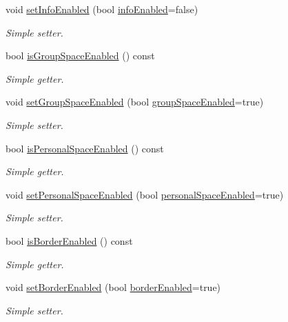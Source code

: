 \begin{DoxyCompactItemize}
void \hyperlink{classGridMap_a2c15016c5c2e1d2befdff013df12fe39}{set\+Info\+Enabled} (bool \hyperlink{classGridMap_ab106fa68828f14f788e697728b94992b}{info\+Enabled}=false)
\begin{DoxyCompactList}\small\item\em Simple setter. \end{DoxyCompactList}\item 
bool \hyperlink{classGridMap_a08ebd0d61670045ed7cbbdf33626d1af}{is\+Group\+Space\+Enabled} () const 
\begin{DoxyCompactList}\small\item\em Simple getter. \end{DoxyCompactList}\item 
void \hyperlink{classGridMap_a0923c16f8e6d2a08f02d8b32d0a5ef40}{set\+Group\+Space\+Enabled} (bool \hyperlink{classGridMap_ace7258ad25fea48c37b88e7de9c0b1b4}{group\+Space\+Enabled}=true)
\begin{DoxyCompactList}\small\item\em Simple setter. \end{DoxyCompactList}\item 
bool \hyperlink{classGridMap_ad37f0bb29e70f2cba3988fd1743d07d9}{is\+Personal\+Space\+Enabled} () const 
\begin{DoxyCompactList}\small\item\em Simple getter. \end{DoxyCompactList}\item 
void \hyperlink{classGridMap_ac5ed7378de3de7f4a4edddfb53a43af0}{set\+Personal\+Space\+Enabled} (bool \hyperlink{classGridMap_ab61a1f66414c31e4ffdd15cbd8c2f373}{personal\+Space\+Enabled}=true)
\begin{DoxyCompactList}\small\item\em Simple setter. \end{DoxyCompactList}\item 
bool \hyperlink{classGridMap_ab56b76831425dc0e3bf1c84d2a42bde1}{is\+Border\+Enabled} () const 
\begin{DoxyCompactList}\small\item\em Simple getter. \end{DoxyCompactList}\item 
void \hyperlink{classGridMap_a3ca0ec500c27b1c47ab0a73bceca44ea}{set\+Border\+Enabled} (bool \hyperlink{classGridMap_aad72652fe3a6ab78b47bce0c0daaaab5}{border\+Enabled}=true)
\begin{DoxyCompactList}\small\item\em Simple setter. \end{DoxyCompactList}\end{DoxyCompactItemize}
